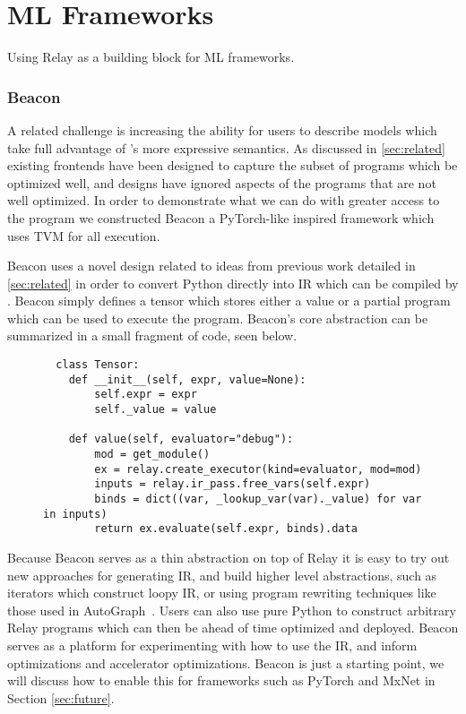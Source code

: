 \chapter{ML Frameworks}
\label{ch:frameworks}

Using Relay as a building block for ML frameworks.


\subsection{Beacon}

A related challenge is increasing the ability for users to describe models which take
  full advantage of \relay's more expressive semantics.
As discussed in \ref{sec:related} existing frontends have been designed to capture the
  subset of programs which be optimized well, and designs have ignored aspects of the
  programs that are not well optimized.
In order to demonstrate what we can do with greater access to the program we constructed
  Beacon a PyTorch-like inspired framework which uses TVM for all execution.

Beacon uses a novel design related to ideas from previous work detailed in \ref{sec:related}
  in order to convert Python directly into IR which can be compiled by \relay.
Beacon simply defines a tensor which stores either a value or a partial program
  which can be used to execute the program.
Beacon's core abstraction can be summarized in a small fragment of code, seen below.

\begin{figure}
\begin{verbatim}
  class Tensor:
    def __init__(self, expr, value=None):
        self.expr = expr
        self._value = value

    def value(self, evaluator="debug"):
        mod = get_module()
        ex = relay.create_executor(kind=evaluator, mod=mod)
        inputs = relay.ir_pass.free_vars(self.expr)
        binds = dict((var, _lookup_var(var)._value) for var in inputs)
        return ex.evaluate(self.expr, binds).data
\end{verbatim}
\end{figure}

Because Beacon serves as a thin abstraction on top of Relay it
  is easy to try out new approaches for generating IR, and build
  higher level abstractions, such as iterators which construct
  loopy IR, or using program rewriting techniques like those
  used in AutoGraph~\citep{AutoGraph}.
Users can also use pure Python to construct arbitrary Relay
  programs which can then be ahead of time optimized and
  deployed.
Beacon serves as a platform for experimenting with how
  to use the IR, and inform optimizations and accelerator optimizations.
Beacon is just a starting point, we will discuss how to enable this for frameworks
  such as PyTorch and MxNet in Section \ref{sec:future}.
